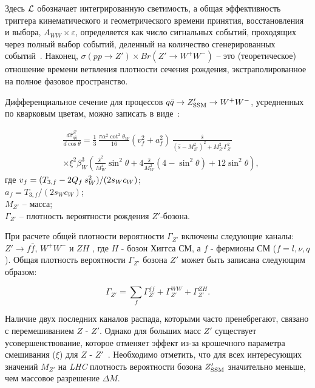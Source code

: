 Здесь $ {\cal L} $ обозначает интегрированную светимость, а общая эффективность триггера кинематического и геометрического времени принятия, восстановления и выбора, $ A_ {WW} \times \varepsilon $, определяется как число сигнальных событий, проходящих через полный выбор событий, деленный на количество сгенерированных событий~\cite{2part-pankov}. Наконец, $ \sigma (pp \to Z ') \times {Br} (Z' \to W ^ + W ^ -) $ -- это (теоретическое) отношение времени ветвления плотности сечения рождения, экстраполированное на полное фазовое пространство.

Дифференциальное сечение для процессов $ q \bar {q} \to Z '_ {\rm SSM} \to W ^ + W ^ - $, усредненных по кварковым цветам, можно записать в виде~\cite{2part-pankov}:

\begin{align}
&\frac{d\hat{\sigma}^{Z'}_{q \bar q}}{d \cos\theta}
= \frac{1}{3}\,\frac{\pi\alpha^2 \cot^2\theta_W}{16 }
\left(v_{f}^2 + a_{f}^2\right)\, \frac{\hat{s}}
{\left(\hat{s} - M_{Z'}^2\right)^2 + M_{Z'}^2\Gamma_{Z'}^2}  \nonumber \\
& \times  \xi^2\beta_W^3 \left(\frac{\hat{s}^2}{M_W^4}
\sin^2\theta +
4\frac{\hat{s}}{M_W^2}(4-\sin^2\theta)+12\sin^2\theta\right),
\label{xsection2}
\end{align}
где $v_f=(T_{3,f}-2Q_f\hskip 2pt s_W^2)/(2s_Wc_W)$;\\
$a_f=T_{3,f}/(2s_Wc_W)$;\\
$M_{Z'}$ -- масса;\\
$\Gamma_{Z'}$ -- плотность вероятности рождения $Z'$-бозона.

При расчете общей плотности вероятности $ \Gamma_ {Z '} $ включены следующие каналы: $ Z' \to f \bar f $, $ W ^ + W ^ - $ и $ ZH $ \cite{2part-pankov}, где $ H $ - бозон Хиггса СМ, а $ f $ - фермионы СМ ($ f = l, \nu, q $). Общая плотность вероятности $ \Gamma_ {Z '} $ бозона $ Z' $ может быть записана следующим образом:

\begin{equation}\label{gamma2}
\Gamma_{Z'} = \sum_f \Gamma_{Z'}^{ff} + \Gamma_{Z'}^{WW} +
\Gamma_{Z'}^{ZH}.
\end{equation}

Наличие двух последних каналов распада, которыми часто пренебрегают, связано с перемешиванием $ Z $ - $ Z '$. Однако для больших масс $ Z '$ существует усовершенствование, которое отменяет эффект из-за крошечного параметра смешивания ($ \xi $) для $ Z $ - $ Z' $~\cite{2part-pankov}. Необходимо отметить, что для всех интересующих значений $ M_ {Z '} $ на \textit{LHC} плотность вероятности бозона $ Z' _ {\rm SSM} $ значительно меньше, чем массовое разрешение $ \Delta M $.

